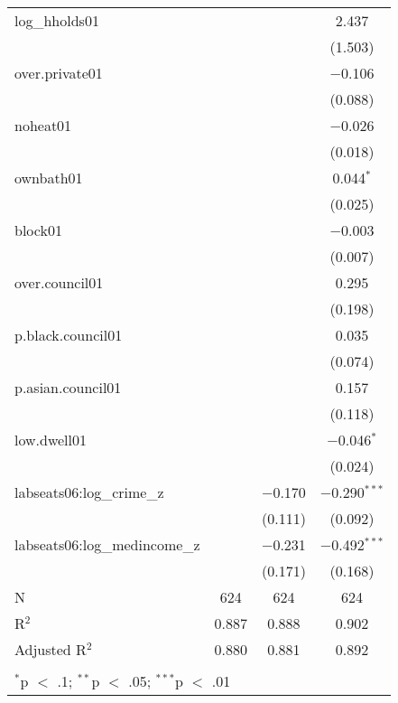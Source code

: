 \begin{table}[!htbp]
\begin{tabular}{@{\extracolsep{5pt}}lccc}
  log\_hholds01 &  &  & 2.437 \\ 
  &  &  & (1.503) \\ 
  over.private01 &  &  & $-$0.106 \\ 
  &  &  & (0.088) \\ 
  noheat01 &  &  & $-$0.026 \\ 
  &  &  & (0.018) \\ 
  ownbath01 &  &  & 0.044$^{*}$ \\ 
  &  &  & (0.025) \\ 
  block01 &  &  & $-$0.003 \\ 
  &  &  & (0.007) \\ 
  over.council01 &  &  & 0.295 \\ 
  &  &  & (0.198) \\ 
  p.black.council01 &  &  & 0.035 \\ 
  &  &  & (0.074) \\ 
  p.asian.council01 &  &  & 0.157 \\ 
  &  &  & (0.118) \\ 
  low.dwell01 &  &  & $-$0.046$^{*}$ \\ 
  &  &  & (0.024) \\ 
  labseats06:log\_crime\_z &  & $-$0.170 & $-$0.290$^{***}$ \\ 
  &  & (0.111) & (0.092) \\ 
  labseats06:log\_medincome\_z &  & $-$0.231 & $-$0.492$^{***}$ \\ 
  &  & (0.171) & (0.168) \\ 
 N & 624 & 624 & 624 \\ 
R$^{2}$ & 0.887 & 0.888 & 0.902 \\ 
Adjusted R$^{2}$ & 0.880 & 0.881 & 0.892 \\ 
\hline \\[-1.8ex] 
\multicolumn{4}{l}{$^{*}$p $<$ .1; $^{**}$p $<$ .05; $^{***}$p $<$ .01} \\ 
\end{tabular} 
\end{table} 
